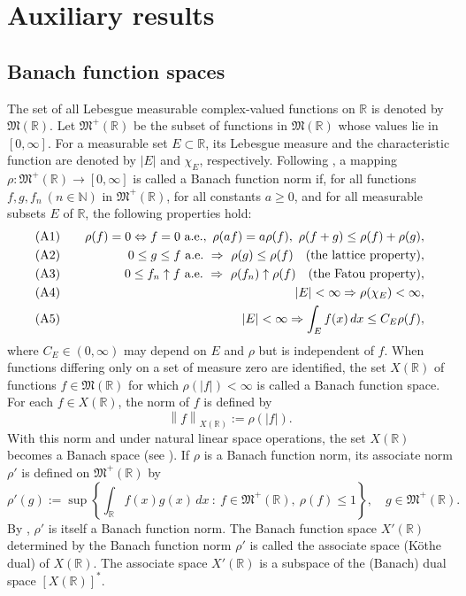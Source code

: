 \documentclass[reqno]{amsproc}
\newcommand{\fM}{\mathfrak{M}}
\newcommand{\N}{\mathbb{N}}
\newcommand{\R}{\mathbb{R}}
\theoremstyle{definition}
\theoremstyle{remark}
\numberwithin{equation}{section}
\begin{document}
\section{Auxiliary results}\label{sec:auxiliary}
\subsection{Banach function spaces}\label{sec:BFS}
The set of all Lebesgue measurable complex-valued functions on $\R$ is denoted
by $\fM(\R)$. Let $\fM^+(\R)$ be the subset of functions in $\fM(\R)$ whose
values lie  in $[0,\infty]$. For a measurable set $E\subset\R$, 
its Lebesgue measure and the characteristic function are denoted by $|E|$ and
$\chi_E$, respectively. Following \cite[Chap.~1, Definition~1.1]{BS88}, a 
mapping $\rho:\fM^+(\R)\to [0,\infty]$ is called a Banach function norm if,
for all functions $f,g, f_n \ (n\in\N)$ in $\fM^+(\R)$, for all
constants $a\ge 0$, and for all measurable subsets $E$ of $\R$,
the following properties hold:
\begin{eqnarray*}
{\rm (A1)} &\quad & \rho(f)=0  \Leftrightarrow  f=0\ \mbox{a.e.}, \
\rho(af)=a\rho(f), \
\rho(f+g) \le \rho(f)+\rho(g),\\
{\rm (A2)} &\quad &0\le g \le f \ \mbox{a.e.} \ \Rightarrow \ \rho(g)
\le \rho(f)
\quad\mbox{(the lattice property)},
\\
{\rm (A3)} &\quad &0\le f_n \uparrow f \ \mbox{a.e.} \ \Rightarrow \
       \rho(f_n) \uparrow \rho(f)\quad\mbox{(the Fatou property)},\\
{\rm (A4)} &\quad & |E|<\infty \Rightarrow \rho(\chi_E) <\infty,\\
{\rm (A5)} &\quad & |E|<\infty \Rightarrow \int_E f(x)\,dx \le C_E\rho(f),
\end{eqnarray*}
where $C_E \in (0,\infty)$ may depend on $E$ and $\rho$ but is
independent of $f$. When functions differing only on a set of measure zero
are identified, the set $X(\R)$ of functions $f\in\fM(\R)$
for which $\rho(|f|)<\infty$ is called a Banach function space. For each
$f\in X(\R)$, the norm of $f$ is defined by
\[
\left\|f\right\|_{X(\R)} :=\rho(|f|).
\]
With this norm and under natural linear space operations, the set $X(\R)$ 
becomes a Banach space (see \cite[Chap.~1, Theorems~1.4 and~1.6]{BS88}). 
If $\rho$ is a Banach function norm, its associate norm $\rho'$ is defined on
$\fM^+(\R)$ by
\[
\rho'(g):=\sup\left\{
\int_{\R} f(x)g(x)\,dx \ : \ f\in \fM^+(\R), \ \rho(f) \le 1
\right\}, \quad g\in \fM^+(\R).
\]
By \cite[Chap.~1, Theorem~2.2]{BS88}, $\rho'$ is itself 
a Banach function norm.
The Banach function space $X'(\R)$ determined by the Banach function norm
$\rho'$ is called the associate space (K\"othe dual) of $X(\R)$.
The associate space $X'(\R)$ is a subspace of the (Banach) dual
space $[X(\R)]^*$.
\end{document}
